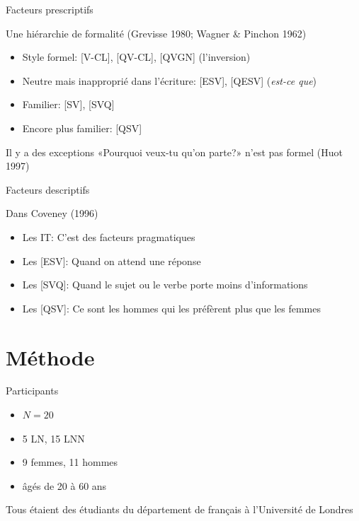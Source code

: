 \documentclass{beamer}
\begin{document}
    \begin{frame}{Facteurs prescriptifs}
      \begin{block}{Une hiérarchie de formalité (Grevisse 1980; Wagner \& Pinchon 1962)}
        \begin{itemize}
          \item Style formel: [V-CL], [QV-CL], [QVGN] (l'inversion)
          \item Neutre mais inapproprié dans l'écriture: [ESV], [QESV] (\emph{est-ce que})
          \item Familier: [SV], [SVQ]
          \item Encore plus familier: [QSV]
        \end{itemize}
      \end{block}
      \begin{block}{Il y a des exceptions}
        «Pourquoi veux-tu qu'on parte?» n'est pas formel (Huot 1997)
      \end{block}
    \end{frame}

    \begin{frame}{Facteurs descriptifs}
      \begin{block}{Dans Coveney (1996)}
        \begin{itemize}
          \item Les IT: C'est des facteurs pragmatiques
          \item Les [ESV]: Quand on attend une réponse
          \item Les [SVQ]: Quand le sujet ou le verbe porte moins d'informations
          \item Les [QSV]: Ce sont les hommes qui les préfèrent plus que les femmes
        \end{itemize}
      \end{block}
    \end{frame}

  \section{Méthode}
    \begin{frame}{Participants}
      \begin{block}{}
        \begin{itemize}
          \item $N = 20$
          \item 5 LN, 15 LNN
          \item 9 femmes, 11 hommes
          \item âgés de 20 à 60 ans
        \end{itemize}
      \end{block}
      \begin{block}{}
        Tous étaient des étudiants du département de français à l'Université de Londres
      \end{block}
    \end{frame}
\end{document}
